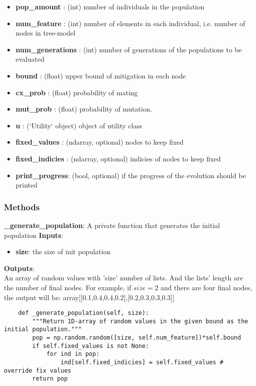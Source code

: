\documentclass[12pt]{article}
\begin{document}
\begin{itemize}
  \item \textbf{pop\_amount} : (int)
		number of individuals in the population
  \item 	\textbf{num\_feature} : (int)
		number of elements in each individual, i.e. number of nodes in tree-model
  \item \textbf{num\_generations} : (int)
		number of generations of the populations to be evaluated
  \item \textbf{bound} : (float)
		upper bound of mitigation in each node
  \item \textbf{cx\_prob} : (float)
		 probability of mating
  \item \textbf{mut\_prob} : (float)
		probability of mutation.
  \item \textbf{u} : (`Utility` object)
		object of utility class
  \item \textbf{fixed\_values} : (ndarray, optional)
		nodes to keep fixed
  \item \textbf{fixed\_indicies} : (ndarray, optional)
		indicies of nodes to keep fixed
  \item \textbf{print\_progress}: (bool, optional)
		if the progress of the evolution should be printed
\end{itemize}

\subsubsection{Methods}
\textbf{\_generate\_population}: A private function that generates the initial population
\textbf{Inputs}:
\begin{itemize}
  \item \textbf{size}: the size of init population
\end{itemize}
\textbf{Outputs}:\\
An array of random values with 'size' number of lists. And the lists' length are the number of final nodes. For example, if $size = 2$ and there are four final nodes, the output will be: array[[0.1,0.4,0.4,0.2],[0.2,0.3,0.3,0.3]]
\begin{verbatim}
	def _generate_population(self, size):
		"""Return 1D-array of random values in the given bound as the initial population."""
		pop = np.random.random([size, self.num_feature])*self.bound
		if self.fixed_values is not None:
			for ind in pop:
				ind[self.fixed_indicies] = self.fixed_values # override fix values
		return pop
\end{verbatim}
\end{document}
